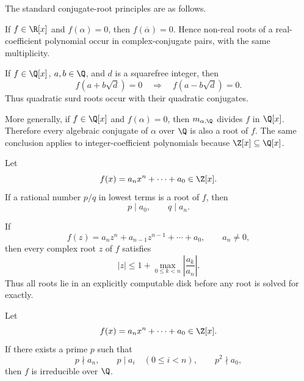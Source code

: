     \begin{theorem}\label{pp:conjugate}
        The standard conjugate-root principles are as follows.
        \begin{conditionlist}
            \item If $f\in\R[x]$ and $f(\alpha)=0$, then
            $f(\overline{\alpha})=0$. Hence non-real roots of a real-coefficient
            polynomial occur in complex-conjugate pairs, with the same
            multiplicity.
            \item If $f\in\Q[x]$, $a,b\in\Q$, and $d$ is a squarefree
            integer, then
            \[
                f(a+b\sqrt d)=0
                \quad\Longrightarrow\quad
                f(a-b\sqrt d)=0.
            \]
            Thus quadratic surd roots occur with their quadratic conjugates.
            \item More generally, if $f\in\Q[x]$ and $f(\alpha)=0$, then
            $m_{\alpha,\Q}$ divides $f$ in $\Q[x]$. Therefore every algebraic
            conjugate of $\alpha$ over $\Q$ is also a root of $f$. The same
            conclusion applies to integer-coefficient polynomials because
            $\Z[x]\subseteq\Q[x]$.
        \end{conditionlist}
    \end{theorem}

    \begin{theorem}
        Let
        \[
            f(x)=a_nx^n+\cdots+a_0\in\Z[x].
        \]
        If a rational number $p/q$ in lowest terms is a root of $f$, then
        \[
            p\mid a_0,
            \qquad
            q\mid a_n.
        \]
    \end{theorem}


    \begin{theorem}
        If
        \[
            f(z)=a_nz^n+a_{n-1}z^{n-1}+\cdots+a_0,
            \qquad
            a_n\neq0,
        \]
        then every complex root $z$ of $f$ satisfies
        \[
            |z|
            \leq
            1+
            \max_{0\leq k<n}\left|\frac{a_k}{a_n}\right|.
        \]
        Thus all roots lie in an explicitly computable disk before any root is
        solved for exactly.
    \end{theorem}

    \begin{theorem}
        Let
        \[
            f(x)=a_nx^n+\cdots+a_0\in\Z[x].
        \]
        If there exists a prime $p$ such that
        \[
            p\nmid a_n,
            \qquad
            p\mid a_i\quad(0\leq i<n),
            \qquad
            p^2\nmid a_0,
        \]
        then $f$ is irreducible over $\Q$.
    \end{theorem}


